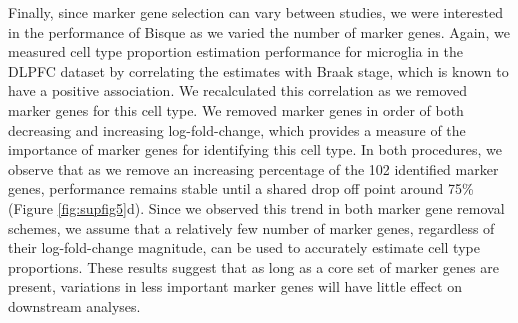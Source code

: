 Finally, since marker gene selection can vary between studies, we were interested in the performance of Bisque as we varied the number of marker genes. Again, we measured cell type proportion estimation performance for microglia in the DLPFC dataset by correlating the estimates with Braak stage, which is known to have a positive association. We recalculated this correlation as we removed marker genes for this cell type. We removed marker genes in order of both decreasing and increasing log-fold-change, which provides a measure of the importance of marker genes for identifying this cell type. In both procedures, we observe that as we remove an increasing percentage of the 102 identified marker genes, performance remains stable until a shared drop off point around 75\% (Figure \ref{fig:supfig5}d). Since we observed this trend in both marker gene removal schemes, we assume that a relatively few number of marker genes, regardless of their log-fold-change magnitude, can be used to accurately estimate cell type proportions. These results suggest that as long as a core set of marker genes are present, variations in less important marker genes will have little effect on downstream analyses.

